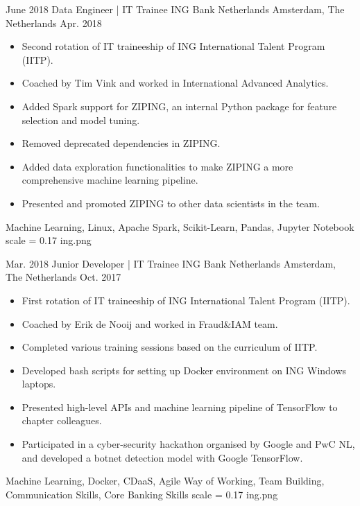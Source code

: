 \begin{experiences}
	\emptySeparator
	
	
	\experience
	{June 2018} {Data Engineer | IT Trainee} {ING Bank Netherlands} {Amsterdam, The Netherlands}
	{Apr. 2018}{
		\begin{itemize}
			\item Second rotation of IT traineeship of ING International Talent Program (IITP).
			\item Coached by Tim Vink and worked in International Advanced Analytics.
			\item Added Spark support for ZIPING, an internal Python package for feature selection and model tuning.
			\item Removed deprecated dependencies in ZIPING.  
			\item Added data exploration functionalities to make ZIPING a more comprehensive machine learning pipeline.
			\item Presented and promoted ZIPING to other data scientists in the team. 
	\end{itemize}}
	{Machine Learning, Linux, Apache Spark, Scikit-Learn, Pandas, Jupyter Notebook}
	{scale = 0.17}		{ing.png} 
	
	\emptySeparator
	
	\experience
	{Mar. 2018} {Junior Developer | IT Trainee} {ING Bank Netherlands} {Amsterdam, The Netherlands}
	{Oct. 2017}{
					\begin{itemize}
						\item First rotation of IT traineeship of ING International Talent Program (IITP).
						\item Coached by Erik de Nooij and worked in Fraud\&IAM team.
						\item Completed various training sessions based on the curriculum of IITP.
						\item Developed bash scripts for setting up Docker environment on ING Windows laptops.  
						\item Presented high-level APIs and machine learning pipeline of TensorFlow to chapter colleagues.
						\item Participated in a cyber-security hackathon organised by Google and PwC NL, and developed a botnet detection model with Google TensorFlow.
				\end{itemize}}
			{Machine Learning, Docker, CDaaS, Agile Way of Working, Team Building, Communication Skills, Core Banking Skills}
		{scale = 0.17}		{ing.png} 
		
	\emptySeparator
	

\end{experiences}
